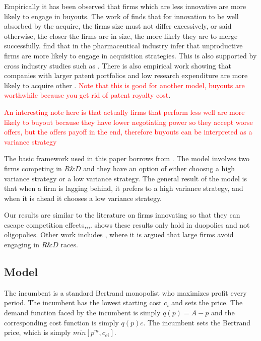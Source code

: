 \documentclass{article}
\begin{document}
Empirically it has been observed that firms which are less innovative are more likely to engage in buyouts. The work of \cite{Gerpott1995} finds that for innovation to be well absorbed by the acquire, the firms size must not differ excessively, or said otherwise, the closer the firms are in size, the more likely they are to merge successfully. \cite{Higgins2006} find that in the pharmaceutical industry  infer that unproductive firms are more likely to engage in acquisition strategies. This is also supported by cross industry studies such as \cite{Zhao2009}. There is also empirical work showing that companies with larger patent portfolios and low research expenditure are more likely to acquire other \cite{Bena2014}.  \textcolor{red}{Note that this is good for another model, buyouts are worthwhile because you get rid of patent royalty cost}. 

\textcolor{red}{An interesting note here is that actually firms that perform less well are more likely to buyout because they have lower negotiating power so they accept worse offers, but the offers payoff in the end, therefore buyouts can be interpreted as a variance strategy}

The basic framework used in this paper borrows from \cite{Cabral2003}. The model involves two firms competing in $R\&D$ and they have an option of either choosng a high variance strategy or a low variance strategy. The general result of the model is that when a firm is lagging behind, it prefers to a high variance strategy, and when it is ahead it chooses a low variance strategy. 

Our results are similar to the literature on firms innovating so that they can escape competition effects,\cite{Aghion2005},\cite{Aghion2001},\cite{Aghion1997}. \cite{Gilbert2016} shows these results only hold in duopolies and not oligopolies. Other work includes \cite{Phillips2012}, where it is argued that large firms avoid engaging in $R\&D$ races. 


\subsection{Model}

The incumbent is a standard Bertrand monopolist who maximizes profit every period. The incumbent has the lowest starting cost $c_i$ and sets the price. The demand function faced by the incumbent is simply $q(p)=A-p$ and the corresponding cost function is simply $q(p)c$. The incumbent sets the Bertrand price, which is simply $min[p^m,c_{ei}]$. 
\end{document}

